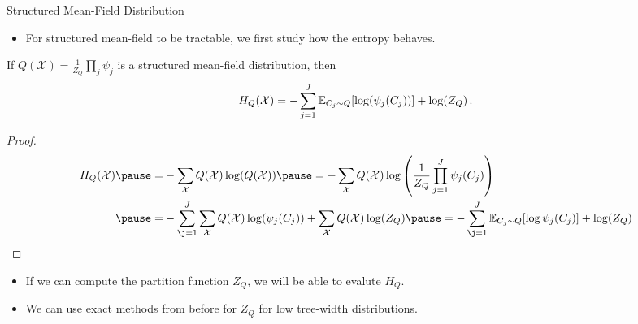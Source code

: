 \begin{frame}{Structured Mean-Field Distribution}
    \begin{itemize}
        \item For structured mean-field to be tractable, we first study how the entropy behaves.
    \end{itemize}
    \pause
    \begin{proposition}
        If $Q(\mathcal{X}) = \frac{1}{Z_Q} \prod_j \psi_j$ is a structured mean-field distribution, then
        \begin{equation}
            H_Q(\mathcal{X}) = - \sum_{j=1}^J \E_{C_j \sim Q}[\log(\psi_j(C_j))] + \log(Z_Q)\,.
        \end{equation}
    \end{proposition}
    \pause
    \begin{proof}
    \begin{equation}
        \begin{aligned}
            H_Q(\mathcal{X}) 
            \pause = & - \sum_{\mathcal{X}} Q(\mathcal{X}) \log(Q(\mathcal{X})) 
            \pause = - \sum_{\mathcal{X}} Q(\mathcal{X}) \log \left( \frac{1}{Z_Q} \prod_{j=1}^J \psi_j(C_j) \right) \\
            \pause = & - \sum_{\j=1}^J \sum_{\mathcal{X}} Q(\mathcal{X}) \log(\psi_j(C_j)) + \sum_{\mathcal{X}} Q(\mathcal{X}) \log(Z_Q) 
            \pause = - \sum_{\j=1}^J \E_{C_j \sim Q}[\log \psi_j(C_j)] + \log(Z_Q) \\
        \end{aligned}
    \end{equation}
    \end{proof}
    \pause
    \begin{itemize}
        \item If we can compute the partition function $Z_Q$, we will be able to evalute $H_Q$.
        \pause \item We can use exact methods from before for $Z_Q$ for low tree-width distributions.
    \end{itemize}
\end{frame}

